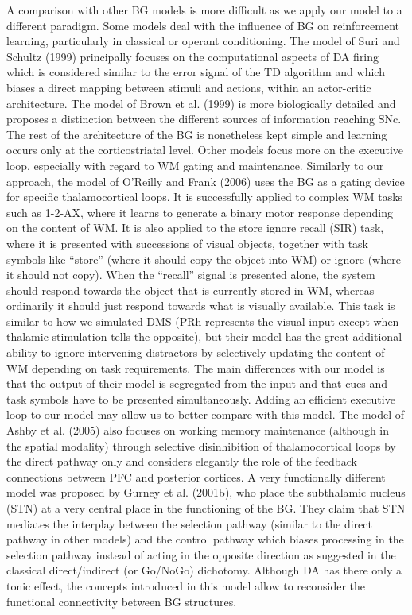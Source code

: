 \documentclass[
  11pt,
  a4paper,
]{scrbook}
\begin{document}
A comparison with other BG models is more difficult as we apply our
model to a different paradigm. Some models deal with the influence of BG
on reinforcement learning, particularly in classical or operant
conditioning. The model of Suri and Schultz (1999) principally focuses
on the computational aspects of DA firing which is considered similar to
the error signal of the TD algorithm and which biases a direct mapping
between stimuli and actions, within an actor-critic architecture. The
model of Brown et al. (1999) is more biologically detailed and proposes
a distinction between the different sources of information reaching SNc.
The rest of the architecture of the BG is nonetheless kept simple and
learning occurs only at the corticostriatal level. Other models focus
more on the executive loop, especially with regard to WM gating and
maintenance. Similarly to our approach, the model of O'Reilly and Frank
(2006) uses the BG as a gating device for specific thalamocortical
loops. It is successfully applied to complex WM tasks such as 1-2-AX,
where it learns to generate a binary motor response depending on the
content of WM. It is also applied to the store ignore recall (SIR) task,
where it is presented with successions of visual objects, together with
task symbols like ``store'' (where it should copy the object into WM) or
ignore (where it should not copy). When the ``recall'' signal is
presented alone, the system should respond towards the object that is
currently stored in WM, whereas ordinarily it should just respond
towards what is visually available. This task is similar to how we
simulated DMS (PRh represents the visual input except when thalamic
stimulation tells the opposite), but their model has the great
additional ability to ignore intervening distractors by selectively
updating the content of WM depending on task requirements. The main
differences with our model is that the output of their model is
segregated from the input and that cues and task symbols have to be
presented simultaneously. Adding an efficient executive loop to our
model may allow us to better compare with this model. The model of Ashby
et al. (2005) also focuses on working memory maintenance (although in
the spatial modality) through selective disinhibition of thalamocortical
loops by the direct pathway only and considers elegantly the role of the
feedback connections between PFC and posterior cortices. A very
functionally different model was proposed by Gurney et al. (2001b), who
place the subthalamic nucleus (STN) at a very central place in the
functioning of the BG. They claim that STN mediates the interplay
between the selection pathway (similar to the direct pathway in other
models) and the control pathway which biases processing in the selection
pathway instead of acting in the opposite direction as suggested in the
classical direct/indirect (or Go/NoGo) dichotomy. Although DA has there
only a tonic effect, the concepts introduced in this model allow to
reconsider the functional connectivity between BG structures.
\end{document}
